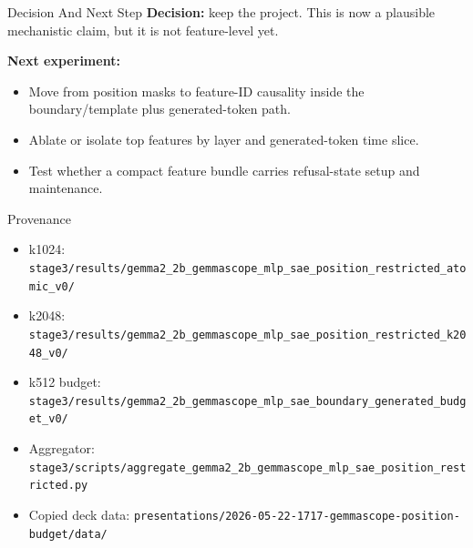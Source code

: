 \documentclass[aspectratio=169]{beamer}
\newcommand{\smallcode}[1]{\texttt{\scriptsize #1}}
\begin{document}
\begin{frame}{Decision And Next Step}
  \textbf{Decision:} keep the project. This is now a plausible mechanistic claim, but it is not feature-level yet.

  \vspace{0.35cm}
  \textbf{Next experiment:}
  \begin{itemize}
    \item Move from position masks to feature-ID causality inside the boundary/template plus generated-token path.
    \item Ablate or isolate top features by layer and generated-token time slice.
    \item Test whether a compact feature bundle carries refusal-state setup and maintenance.
  \end{itemize}
\end{frame}

\begin{frame}{Provenance}
  \scriptsize
  \begin{itemize}
    \item k1024: \smallcode{stage3/results/gemma2\_2b\_gemmascope\_mlp\_sae\_position\_restricted\_atomic\_v0/}
    \item k2048: \smallcode{stage3/results/gemma2\_2b\_gemmascope\_mlp\_sae\_position\_restricted\_k2048\_v0/}
    \item k512 budget: \smallcode{stage3/results/gemma2\_2b\_gemmascope\_mlp\_sae\_boundary\_generated\_budget\_v0/}
    \item Aggregator: \smallcode{stage3/scripts/aggregate\_gemma2\_2b\_gemmascope\_mlp\_sae\_position\_restricted.py}
    \item Copied deck data: \smallcode{presentations/2026-05-22-1717-gemmascope-position-budget/data/}
  \end{itemize}
\end{frame}
\end{document}
